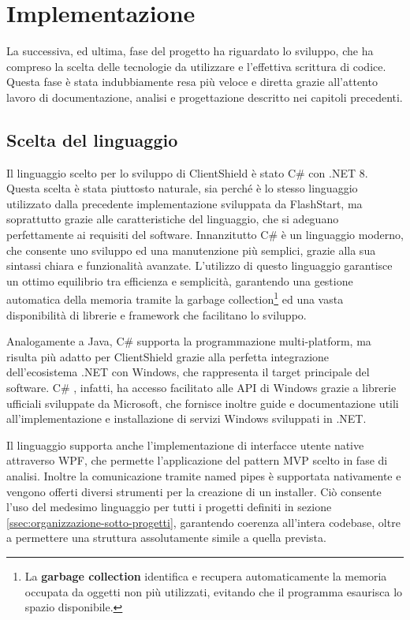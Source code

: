 \documentclass[12pt,a4paper,openright,twoside]{book}
\newcommand{\cs}{C\# }
\begin{document}

\chapter{Implementazione}

La successiva, ed ultima, fase del progetto ha riguardato lo sviluppo, che ha compreso la scelta delle tecnologie da utilizzare e l'effettiva scrittura di codice.
Questa fase è stata indubbiamente resa più veloce e diretta grazie all'attento lavoro di documentazione, analisi e progettazione descritto nei capitoli precedenti.

\section{Scelta del linguaggio}

Il linguaggio scelto per lo sviluppo di ClientShield è stato \cs con .NET 8.
Questa scelta è stata piuttosto naturale, sia perché è lo stesso linguaggio utilizzato dalla precedente implementazione sviluppata da FlashStart, ma soprattutto grazie alle caratteristiche del linguaggio, che si adeguano perfettamente ai requisiti del software.
Innanzitutto \cs è un linguaggio moderno, che consente uno sviluppo ed una manutenzione più semplici, grazie alla sua sintassi chiara e funzionalità avanzate.
L'utilizzo di questo linguaggio garantisce un ottimo equilibrio tra efficienza e semplicità, garantendo una gestione automatica della memoria tramite la garbage collection\footnote{La \textbf{garbage collection} identifica e recupera automaticamente la memoria occupata da oggetti non più utilizzati, evitando che il programma esaurisca lo spazio disponibile.} ed una vasta disponibilità di librerie e framework che facilitano lo sviluppo.

Analogamente a Java, \cs supporta la programmazione multi-platform, ma risulta più adatto per ClientShield grazie alla perfetta integrazione dell'ecosistema .NET con Windows, che rappresenta il target principale del software.
\cs, infatti, ha accesso facilitato alle API di Windows grazie a librerie ufficiali sviluppate da Microsoft, che fornisce inoltre guide e documentazione utili all'implementazione e installazione di servizi Windows sviluppati in .NET. 

Il linguaggio supporta anche l'implementazione di interfacce utente native attraverso \gls{WPF}, che permette l'applicazione del pattern \gls{MVP} scelto in fase di analisi.
Inoltre la comunicazione tramite named pipes è supportata nativamente e vengono offerti diversi strumenti per la creazione di un installer.
Ciò consente l'uso del medesimo linguaggio per tutti i progetti definiti in sezione \ref{ssec:organizzazione-sotto-progetti}, garantendo coerenza all'intera codebase, oltre a permettere una struttura assolutamente simile a quella prevista.
\end{document}
